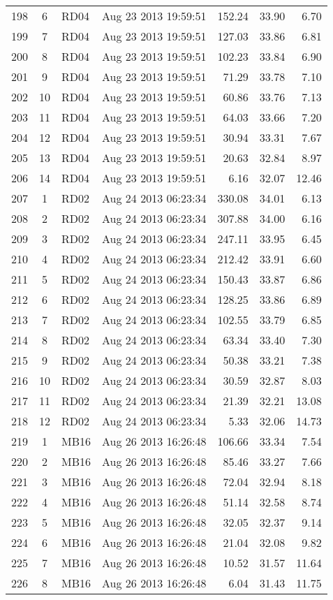 \documentclass{article}
\begin{document}
\begin{longtable}{ccllrrr}
198&6&RD04&Aug 23 2013 19:59:51&152.24&33.90&6.70\\
199&7&RD04&Aug 23 2013 19:59:51&127.03&33.86&6.81\\
200&8&RD04&Aug 23 2013 19:59:51&102.23&33.84&6.90\\
201&9&RD04&Aug 23 2013 19:59:51&71.29&33.78&7.10\\
202&10&RD04&Aug 23 2013 19:59:51&60.86&33.76&7.13\\
203&11&RD04&Aug 23 2013 19:59:51&64.03&33.66&7.20\\
204&12&RD04&Aug 23 2013 19:59:51&30.94&33.31&7.67\\
205&13&RD04&Aug 23 2013 19:59:51&20.63&32.84&8.97\\
206&14&RD04&Aug 23 2013 19:59:51&6.16&32.07&12.46\\
\hline 
207&1&RD02&Aug 24 2013 06:23:34&330.08&34.01&6.13\\
208&2&RD02&Aug 24 2013 06:23:34&307.88&34.00&6.16\\
209&3&RD02&Aug 24 2013 06:23:34&247.11&33.95&6.45\\
210&4&RD02&Aug 24 2013 06:23:34&212.42&33.91&6.60\\
211&5&RD02&Aug 24 2013 06:23:34&150.43&33.87&6.86\\
212&6&RD02&Aug 24 2013 06:23:34&128.25&33.86&6.89\\
213&7&RD02&Aug 24 2013 06:23:34&102.55&33.79&6.85\\
214&8&RD02&Aug 24 2013 06:23:34&63.34&33.40&7.30\\
215&9&RD02&Aug 24 2013 06:23:34&50.38&33.21&7.38\\
216&10&RD02&Aug 24 2013 06:23:34&30.59&32.87&8.03\\
217&11&RD02&Aug 24 2013 06:23:34&21.39&32.21&13.08\\
218&12&RD02&Aug 24 2013 06:23:34&5.33&32.06&14.73\\
\hline 
219&1&MB16&Aug 26 2013 16:26:48&106.66&33.34&7.54\\
220&2&MB16&Aug 26 2013 16:26:48&85.46&33.27&7.66\\
221&3&MB16&Aug 26 2013 16:26:48&72.04&32.94&8.18\\
222&4&MB16&Aug 26 2013 16:26:48&51.14&32.58&8.74\\
223&5&MB16&Aug 26 2013 16:26:48&32.05&32.37&9.14\\
224&6&MB16&Aug 26 2013 16:26:48&21.04&32.08&9.82\\
225&7&MB16&Aug 26 2013 16:26:48&10.52&31.57&11.64\\
226&8&MB16&Aug 26 2013 16:26:48&6.04&31.43&11.75\\

\end{longtable}
\end{document}
